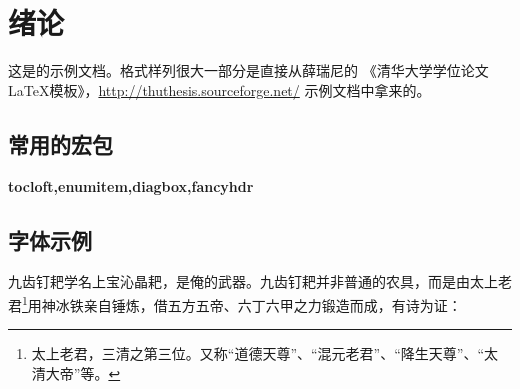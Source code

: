 \chapter{绪论}

这是的示例文档。格式样列很大一部分是直接从薛瑞尼的 {《清华大学学位论文 \LaTeX 模板》，\url{http://thuthesis.sourceforge.net/}} 示例文档中拿来的。

\section{常用的宏包}
\textbf{tocloft,\quad enumitem,\quad diagbox,\quad fancyhdr}

\section{字体示例}

九齿钉耙学名{\kaishu 上宝沁晶耙}，是俺的武器。九齿钉耙并非普通的农具，而是由太上老君\footnote{太上老君，三清之第三位。又称“道德天尊”、“混元老君”、“降生天尊”、“太清大帝”等。}用神冰铁亲自锤炼，借五方五帝、六丁六甲之力锻造而成，有诗为证：

\vspace{-5mm}

